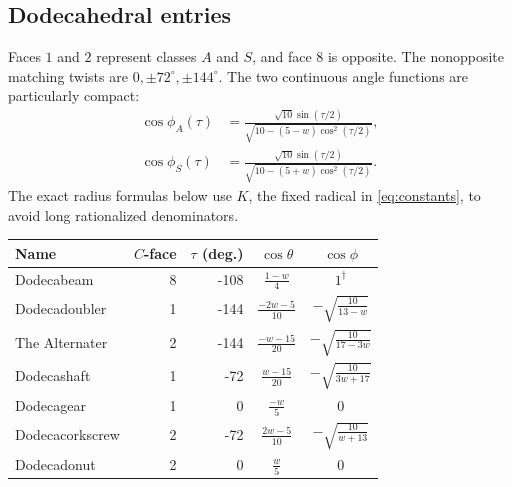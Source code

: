 \documentclass[11pt]{article}
\theoremstyle{definition}
\newcommand{\degc}{^{\circ}}
\begin{document}
\subsection{Dodecahedral entries}
Faces $1$ and $2$ represent classes $A$ and $S$, and face $8$ is opposite.
The nonopposite matching twists are $0,\pm72\degc,\pm144\degc$.
The two continuous angle functions are particularly compact:
\begin{equation}\label{eq:dodphi}
 \begin{aligned}
 \cos\phi_A(\tau)&=
 \frac{\sqrt{10}\sin(\tau/2)}{\sqrt{10-(5-w)\cos^2(\tau/2)}},\\[4pt]
 \cos\phi_S(\tau)&=
 \frac{\sqrt{10}\sin(\tau/2)}{\sqrt{10-(5+w)\cos^2(\tau/2)}}.
 \end{aligned}
\end{equation}
The exact radius formulas below use $K$, the fixed radical in
\eqref{eq:constants}, to avoid long rationalized denominators.
\begin{center}
\small
\renewcommand{\arraystretch}{1.55}
\begin{tabular}{@{}lrrcc@{}}
\toprule
Name & $C$-face & $\tau$ (deg.) & $\cos\theta$ & $\cos\phi$\\
\midrule
Dodecabeam & 8 & -108 & $\displaystyle \frac{1 - w}{4}$ & $\displaystyle 1^{\dagger}$\\
Dodecadoubler & 1 & -144 & $\displaystyle \frac{- 2 w - 5}{10}$ & $\displaystyle - \sqrt{\frac{10}{13 - w}}$\\
The Alternater & 2 & -144 & $\displaystyle \frac{- w - 15}{20}$ & $\displaystyle - \sqrt{\frac{10}{17 - 3 w}}$\\
Dodecashaft & 1 & -72 & $\displaystyle \frac{w - 15}{20}$ & $\displaystyle - \sqrt{\frac{10}{3 w + 17}}$\\
Dodecagear & 1 & 0 & $\displaystyle \frac{- w}{5}$ & $\displaystyle 0$\\
Dodecacorkscrew & 2 & -72 & $\displaystyle \frac{2 w - 5}{10}$ & $\displaystyle - \sqrt{\frac{10}{w + 13}}$\\
Dodecadonut & 2 & 0 & $\displaystyle \frac{w}{5}$ & $\displaystyle 0$\\
\bottomrule
\end{tabular}
\end{center}
\end{document}
